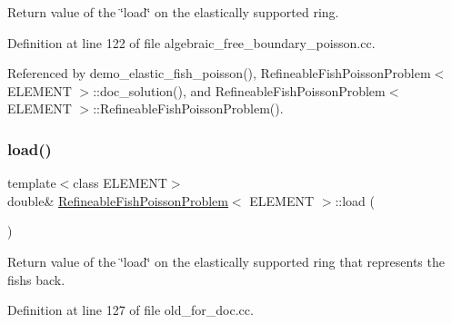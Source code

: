 Return value of the \char`\"{}load\char`\"{} on the elastically supported ring. 



Definition at line 122 of file algebraic\+\_\+free\+\_\+boundary\+\_\+poisson.\+cc.



Referenced by demo\+\_\+elastic\+\_\+fish\+\_\+poisson(), Refineable\+Fish\+Poisson\+Problem$<$ E\+L\+E\+M\+E\+N\+T $>$\+::doc\+\_\+solution(), and Refineable\+Fish\+Poisson\+Problem$<$ E\+L\+E\+M\+E\+N\+T $>$\+::\+Refineable\+Fish\+Poisson\+Problem().

\mbox{\label{classRefineableFishPoissonProblem_a20702e8945d442c9597348b550da14e4}} 
\subsubsection{\texorpdfstring{load()}{load()}\hspace{0.1cm}{\footnotesize\ttfamily [2/2]}}
{\footnotesize\ttfamily template$<$class E\+L\+E\+M\+E\+NT$>$ \\
double\& \hyperlink{classRefineableFishPoissonProblem}{Refineable\+Fish\+Poisson\+Problem}$<$ E\+L\+E\+M\+E\+NT $>$\+::load (\begin{DoxyParamCaption}{ }\end{DoxyParamCaption})\hspace{0.3cm}{\ttfamily [inline]}}



Return value of the \char`\"{}load\char`\"{} on the elastically supported ring that represents the fish\textquotesingle{}s back. 



Definition at line 127 of file old\+\_\+for\+\_\+doc.\+cc.

\mbox{\label{classRefineableFishPoissonProblem_a122cddf55249eaf0ee813818ff101fb4}} 
